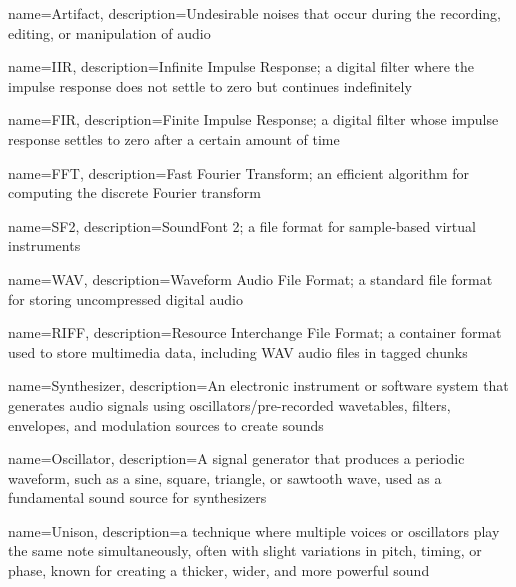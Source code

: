 {
    name={Artifact},
    description={Undesirable noises that occur during the recording, editing, or manipulation of audio}
}

{
    name={IIR},
    description={Infinite Impulse Response; a digital filter where the impulse response does not 
    settle to zero but continues indefinitely}
}

{
    name={FIR},
    description={Finite Impulse Response; a digital filter whose impulse response settles to zero after a certain amount of time}
}

{
    name={FFT},
    description={Fast Fourier Transform; an efficient algorithm for computing the discrete Fourier transform}
}

{
    name={SF2},
    description={SoundFont 2; a file format for sample-based virtual instruments}
}

{
    name={WAV},
    description={Waveform Audio File Format; a standard file format for storing uncompressed digital audio}
}

{
    name={RIFF},
    description={Resource Interchange File Format; a container format used to store multimedia data, including WAV audio files in tagged chunks}
}



{
    name={Synthesizer},
    description={An electronic instrument or software system that generates audio signals using 
    oscillators/pre-recorded wavetables, filters, envelopes, and modulation sources to create sounds}
}

{
    name={Oscillator},
    description={A signal generator that produces a periodic waveform, such as a sine, 
    square, triangle, or sawtooth wave, used as a fundamental sound source for synthesizers}
}

{
    name={Unison},
    description={a technique where multiple voices or oscillators play the same note 
    simultaneously, often with slight variations in pitch, timing, or phase, known 
    for creating a thicker, wider, and more powerful sound}
}

